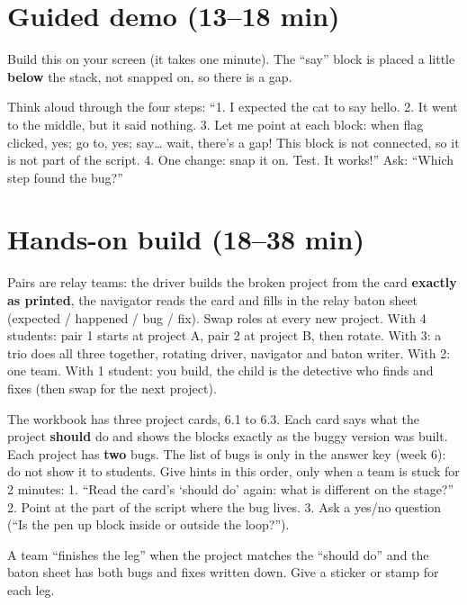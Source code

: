 \section{Guided demo (13--18 min)}
\begin{workedexample}
Build this on your screen (it takes one minute). The \enquote{say} block is placed a little \textbf{below} the stack, not snapped on, so there is a gap.
\begin{center}
\begin{scratch}[scale=0.8]
\blockspace[0.8]
\end{scratch}
\end{center}
Think aloud through the four steps: \enquote{1. I expected the cat to say hello. 2. It went to the middle, but it said nothing. 3. Let me point at each block: when flag clicked, yes; go to, yes; say\ldots{} wait, there's a gap! This block is not connected, so it is not part of the script. 4. One change: snap it on. Test. It works!} Ask: \enquote{Which step found the bug?}
\end{workedexample}

\section{Hands-on build (18--38 min)}
\begin{pairroles}
Pairs are relay teams: the driver builds the broken project from the card \textbf{exactly as printed}, the navigator reads the card and fills in the relay baton sheet (expected / happened / bug / fix). Swap roles at every new project. With 4 students: pair 1 starts at project A, pair 2 at project B, then rotate. With 3: a trio does all three together, rotating driver, navigator and baton writer. With 2: one team. With 1 student: you build, the child is the detective who finds and fixes (then swap for the next project).
\end{pairroles}

\begin{bughunt}
The workbook has three project cards, 6.1 to 6.3. Each card says what the project \textbf{should} do and shows the blocks exactly as the buggy version was built. Each project has \textbf{two} bugs. The list of bugs is only in the answer key (week 6): do not show it to students. Give hints in this order, only when a team is stuck for 2 minutes: 1. \enquote{Read the card's \enquote{should do} again: what is different on the stage?} 2. Point at the part of the script where the bug lives. 3. Ask a yes/no question (\enquote{Is the pen up block inside or outside the loop?}).

A team \enquote{finishes the leg} when the project matches the \enquote{should do} and the baton sheet has both bugs and fixes written down. Give a sticker or stamp for each leg.
\end{bughunt}

